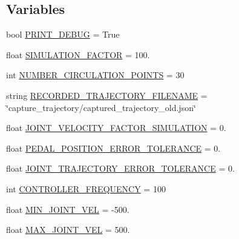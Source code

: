 \subsection*{Variables}
\begin{DoxyCompactItemize}
\item 
bool \mbox{\hyperlink{namespacepedal__simulation__interpolation__lennard_aaaeb9d77bf6369027c975750d613c50f}{P\+R\+I\+N\+T\+\_\+\+D\+E\+B\+UG}} = True
\item 
float \mbox{\hyperlink{namespacepedal__simulation__interpolation__lennard_a1545c9ccf6f88584eccdaac91209bf1d}{S\+I\+M\+U\+L\+A\+T\+I\+O\+N\+\_\+\+F\+A\+C\+T\+OR}} = 100.
\item 
int \mbox{\hyperlink{namespacepedal__simulation__interpolation__lennard_a563b67735f05f4b4c737ec84ceb1f0bb}{N\+U\+M\+B\+E\+R\+\_\+\+C\+I\+R\+C\+U\+L\+A\+T\+I\+O\+N\+\_\+\+P\+O\+I\+N\+TS}} = 30
\item 
string \mbox{\hyperlink{namespacepedal__simulation__interpolation__lennard_aa67e52f7771732ab256a8d8d5f084d41}{R\+E\+C\+O\+R\+D\+E\+D\+\_\+\+T\+R\+A\+J\+E\+C\+T\+O\+R\+Y\+\_\+\+F\+I\+L\+E\+N\+A\+ME}} = \char`\"{}capture\+\_\+trajectory/captured\+\_\+trajectory\+\_\+old.\+json\char`\"{}
\item 
float \mbox{\hyperlink{namespacepedal__simulation__interpolation__lennard_aa36089b7b0103a5a7b8dd3570ad0ee3e}{J\+O\+I\+N\+T\+\_\+\+V\+E\+L\+O\+C\+I\+T\+Y\+\_\+\+F\+A\+C\+T\+O\+R\+\_\+\+S\+I\+M\+U\+L\+A\+T\+I\+ON}} = 0.
\item 
float \mbox{\hyperlink{namespacepedal__simulation__interpolation__lennard_a9c7b44e4ea4981585f68cf184b27c529}{P\+E\+D\+A\+L\+\_\+\+P\+O\+S\+I\+T\+I\+O\+N\+\_\+\+E\+R\+R\+O\+R\+\_\+\+T\+O\+L\+E\+R\+A\+N\+CE}} = 0.
\item 
float \mbox{\hyperlink{namespacepedal__simulation__interpolation__lennard_aba0265a04b482028d7b18755d8140084}{J\+O\+I\+N\+T\+\_\+\+T\+R\+A\+J\+E\+C\+T\+O\+R\+Y\+\_\+\+E\+R\+R\+O\+R\+\_\+\+T\+O\+L\+E\+R\+A\+N\+CE}} = 0.
\item 
int \mbox{\hyperlink{namespacepedal__simulation__interpolation__lennard_a3dc653f4494bf666747154ef6d41fe09}{C\+O\+N\+T\+R\+O\+L\+L\+E\+R\+\_\+\+F\+R\+E\+Q\+U\+E\+N\+CY}} = 100
\item 
float \mbox{\hyperlink{namespacepedal__simulation__interpolation__lennard_a274f5fe2f520f59c1ab6c05cf4cdfd8a}{M\+I\+N\+\_\+\+J\+O\+I\+N\+T\+\_\+\+V\+EL}} = -\/500.
\item 
float \mbox{\hyperlink{namespacepedal__simulation__interpolation__lennard_af547dd846e0f487ba36ddeeb5974883e}{M\+A\+X\+\_\+\+J\+O\+I\+N\+T\+\_\+\+V\+EL}} = 500.

\end{DoxyCompactItemize}

